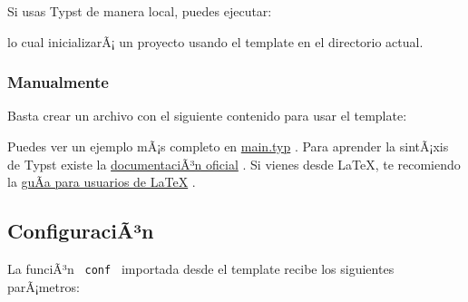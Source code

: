 Si usas Typst de manera local, puedes ejecutar:

\begin{Shaded}
\begin{Highlighting}[]
\end{Highlighting}
\end{Shaded}

lo cual inicializarÃ¡ un proyecto usando el template en el directorio
actual.

\subsubsection{Manualmente}\label{manualmente}

Basta crear un archivo con el siguiente contenido para usar el template:

\begin{Shaded}
\begin{Highlighting}[]

\NormalTok{  ),}
\NormalTok{)}

\end{Highlighting}
\end{Shaded}

Puedes ver un ejemplo mÃ¡s completo en
\href{https://github.com/typst/packages/raw/main/packages/preview/enunciado-facil-fcfm/0.1.0/template/main.typ}{main.typ}
. Para aprender la sintÃ¡xis de Typst existe la
\href{https://typst.app/docs}{documentaciÃ³n oficial} . Si vienes desde
LaTeX, te recomiendo la
\href{https://typst.app/docs/guides/guide-for-latex-users/}{guÃ­a para
usuarios de LaTeX} .

\subsection{ConfiguraciÃ³n}\label{configuraciuxe3uxb3n}

La funciÃ³n \texttt{\ conf\ } importada desde el template recibe los
siguientes parÃ¡metros:

